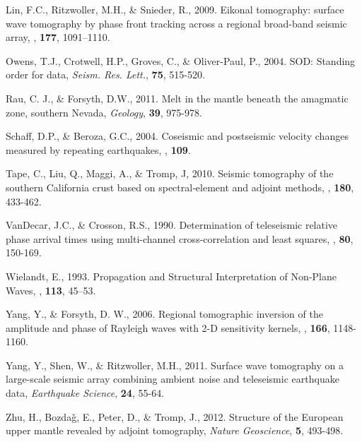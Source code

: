 \documentclass{gji}
\begin{document}
\begin{thebibliography}{}
	   Lin, F.C., Ritzwoller, M.H., \& Snieder, R., 2009. Eikonal tomography: surface wave tomography by phase front tracking across a regional broad-band seismic array, \textit{\gji}, \textbf{177}, 1091–1110. 

	   Owens, T.J., Crotwell, H.P., Groves, C., \& Oliver-Paul, P., 2004. SOD: Standing order for data, \textit{Seism. Res. Lett.}, \textbf{75}, 515-520.

	   Rau, C. J., \& Forsyth, D.W., 2011. Melt in the mantle beneath the amagmatic zone, southern Nevada, \textit{Geology}, \textbf{39}, 975-978.

	   Schaff, D.P., \& Beroza, G.C., 2004. Coseismic and postseismic velocity changes measured by repeating earthquakes, \textit{\jgr}, \textbf{109}.

	   Tape, C., Liu, Q., Maggi, A., \& Tromp, J, 2010. Seismic tomography of the southern California crust based on spectral‐element and adjoint methods, \textit{\gji}, \textbf{180}, 433-462.

	   VanDecar, J.C., \& Crosson, R.S., 1990. Determination of teleseismic relative phase arrival times using multi-channel cross-correlation and least squares, \textit{\bssa}, \textbf{80}, 150-169.

	   Wielandt, E., 1993. Propagation and Structural Interpretation of Non‐Plane Waves, \textit{\gji}, \textbf{113}, 45–53.

	   Yang, Y., \& Forsyth, D. W., 2006. Regional tomographic inversion of the amplitude and phase of Rayleigh waves with 2-D sensitivity kernels, \textit{\gji}, \textbf{166}, 1148-1160.

	   Yang, Y., Shen, W., \& Ritzwoller, M.H., 2011. Surface wave tomography on a large-scale seismic array combining ambient noise and teleseismic earthquake data, \textit{Earthquake Science}, \textbf{24}, 55-64.

	   Zhu, H., Bozda\v{g}, E., Peter, D., \& Tromp, J., 2012. Structure of the European upper mantle revealed by adjoint tomography, \textit{Nature Geoscience}, \textbf{5}, 493-498.

\end{thebibliography}

\label{lastpage}
\end{document}
